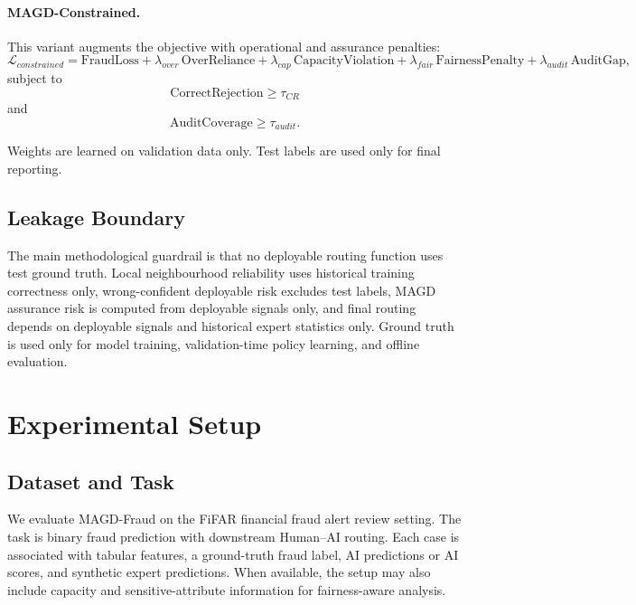 \paragraph{MAGD-Constrained.}
This variant augments the objective with operational and assurance penalties:
\begin{equation}
\mathcal{L}_{constrained} =
\text{FraudLoss}
+ \lambda_{over}\,\text{OverReliance}
+ \lambda_{cap}\,\text{CapacityViolation}
+ \lambda_{fair}\,\text{FairnessPenalty}
+ \lambda_{audit}\,\text{AuditGap},
\end{equation}
subject to
\begin{equation}
\text{CorrectRejection} \ge \tau_{CR}
\end{equation}
and
\begin{equation}
\text{AuditCoverage} \ge \tau_{audit}.
\end{equation}

Weights are learned on validation data only. Test labels are used only for final reporting.

\subsection{Leakage Boundary}
\label{subsec:leakage_boundary}

The main methodological guardrail is that no deployable routing function uses test ground truth. Local neighbourhood reliability uses historical training correctness only, wrong-confident deployable risk excludes test labels, MAGD assurance risk is computed from deployable signals only, and final routing depends on deployable signals and historical expert statistics only. Ground truth is used only for model training, validation-time policy learning, and offline evaluation.

\section{Experimental Setup}
\label{sec:experimental_setup}

\subsection{Dataset and Task}
\label{subsec:data_task}

We evaluate MAGD-Fraud on the FiFAR financial fraud alert review setting. The task is binary fraud prediction with downstream Human--AI routing. Each case is associated with tabular features, a ground-truth fraud label, AI predictions or AI scores, and synthetic expert predictions. When available, the setup may also include capacity and sensitive-attribute information for fairness-aware analysis.

